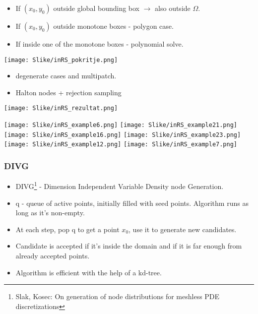 \documentclass{beamer}
\begin{document}
\begin{frame}

\begin{itemize}
\item<2-> If $(x_0,y_0)$ outside global bounding box $\to$ also outside $\Omega$.
\item<3-> If $(x_0,y_0)$ outside monotone boxes - polygon case.
\item<4-> If inside one of the monotone boxes - polynomial solve.
\end{itemize}
\texttt{[image: Slike/inRS\_pokritje.png]}
\end{frame}
\begin{frame}

\begin{itemize}
\item<1-> degenerate cases and multipatch.
\end{itemize}
\end{frame}
\begin{frame}

\begin{itemize}
\item<1-> Halton nodes + rejection sampling
\end{itemize}
\texttt{[image: Slike/inRS\_rezultat.png]}
\end{frame}
\begin{frame}

\texttt{[image: Slike/inRS\_example6.png]}
\texttt{[image: Slike/inRS\_example21.png]}
\texttt{[image: Slike/inRS\_example16.png]}
\texttt{[image: Slike/inRS\_example23.png]}
\texttt{[image: Slike/inRS\_example12.png]}
\texttt{[image: Slike/inRS\_example7.png]}
\end{frame}
\begin{frame}
\frametitle{DIVG}
\begin{itemize}
\item<1-> DIVG\footnote{Slak, Kosec: On generation of node distributions for meshless PDE discretizations} - Dimension Independent Variable Density node Generation.
\item<3-> q - queue of active points, initially filled with seed points. Algorithm runs as long as it's non-empty.
\item<4-> At each step, pop q to get a point $x_0$, use it to generate new candidates.
\item<5-> Candidate is accepted if it's inside the domain and if it is far enough from already accepted points.
\item<6-> Algorithm is efficient with the help of a kd-tree.
\end{itemize}
\end{frame}
\end{document}
